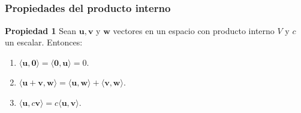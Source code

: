 
\subsection{}

\begin{frame}\frametitle{Propiedades del producto interno}
	
	\begin{prop}{\textbf{Propiedad 1}}
		\justifying
		Sean $\mathbf{u},\mathbf{v}$ y $\mathbf{w}$ vectores en un espacio con producto interno $V$ y $c$ un escalar. Entonces:
		\begin{enumerate}			
			\justifying
			\item[\labelname{$a$}] $\langle \mathbf{u}, \mathbf{0}\rangle = \langle \mathbf{0}, \mathbf{u}\rangle = 0$. \\%
			\item[\labelname{$b$}] $\langle \mathbf{u} + \mathbf{v},\mathbf{w}\rangle 
			= \langle \mathbf{u}, \mathbf{w}\rangle + \langle \mathbf{v}, \mathbf{w}\rangle$. \\%
			\item[\labelname{$c$}] $\langle \mathbf{u}, c\mathbf{v}\rangle = c\langle \mathbf{u}, \mathbf{v}\rangle$.\\
		\end{enumerate}		
	\end{prop}
	
\end{frame}


\subsection{}

